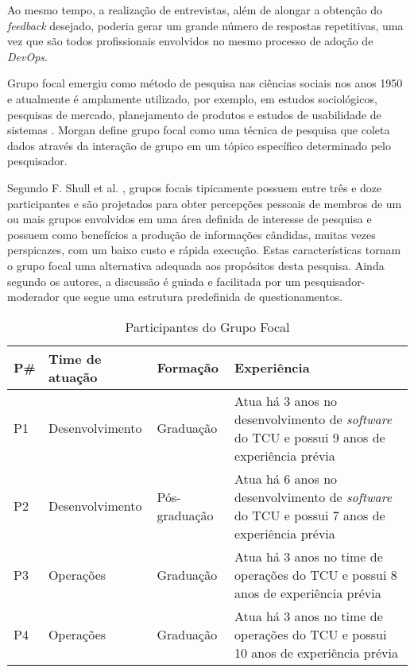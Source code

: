 Ao mesmo tempo, a realização de entrevistas, além de alongar a obtenção do
\textit{feedback} desejado, poderia gerar um grande número de respostas
repetitivas, uma vez que são todos profissionais envolvidos no mesmo processo
de adoção de \textit{DevOps}.

Grupo focal emergiu como método de pesquisa nas ciências sociais nos anos 1950
e atualmente é amplamente utilizado, por exemplo, em estudos sociológicos,
pesquisas de mercado, planejamento de produtos e estudos de usabilidade de
sistemas \cite{shull2007guide}. Morgan \cite{morgan1996focus} define grupo focal
como uma técnica de pesquisa que coleta dados através da interação de grupo em
um tópico específico determinado pelo pesquisador.

Segundo F. Shull et al. \cite{shull2007guide}, grupos focais tipicamente
possuem entre três e doze participantes e são projetados para obter percepções
pessoais de membros de um ou mais grupos envolvidos em uma área definida de
interesse de pesquisa e possuem como benefícios a produção de informações
cândidas, muitas vezes perspicazes, com um baixo custo e rápida execução.
Estas características tornam o grupo focal uma alternativa adequada aos
propósitos desta pesquisa. Ainda segundo os autores, a discussão é guiada e
facilitada por um pesquisador-moderador que segue uma estrutura predefinida
de questionamentos.

\begin{table}[hb!]
\centering
\caption{Participantes do Grupo Focal}
\label{tabela_participantes_grupo_focal}
\begin{tabular}{|p{1cm}|p{4cm}|p{3cm}|p{7cm}|} \hline
{\bf P\#} & {\bf Time de atuação} & {\bf Formação} & {\bf Experiência}\\ \hline
P1 & Desenvolvimento & Graduação & Atua há 3 anos no desenvolvimento de {\it software} do \acrshort{TCU} e possui 9 anos de experiência prévia \\ \hline
P2 & Desenvolvimento & Pós-graduação & Atua há 6 anos no desenvolvimento de {\it software} do \acrshort{TCU} e possui 7 anos de experiência prévia \\ \hline
P3 & Operações & Graduação & Atua há 3 anos no time de operações do \acrshort{TCU} e possui 8 anos de experiência prévia \\ \hline
P4 & Operações & Graduação & Atua há 3 anos no time de operações do \acrshort{TCU} e possui 10 anos de experiência prévia \\ \hline
\end{tabular}
\end{table}

